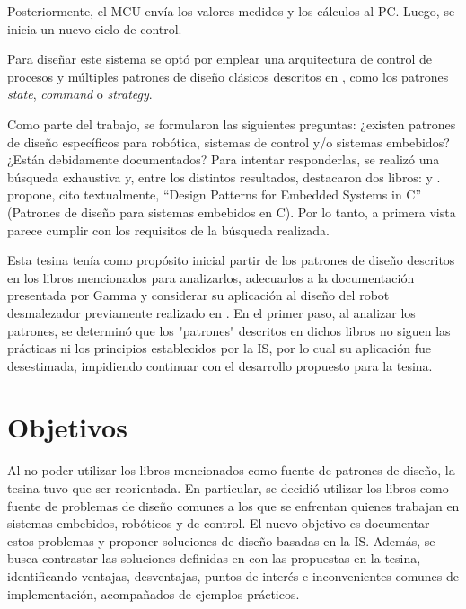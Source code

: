 Posteriormente, el MCU envía los valores medidos y los cálculos al PC. Luego, se inicia un nuevo ciclo de control.

Para diseñar este sistema se optó por emplear una arquitectura de control de procesos \cite[pág. 27]{ShawGarlan1996} y múltiples patrones de diseño clásicos descritos en \cite{Gamma:1995:DPE:186897}, como los patrones \textit{state}, \textit{command} o \textit{strategy}.

Como parte del trabajo, se formularon las siguientes preguntas: ¿existen patrones de diseño específicos para robótica, sistemas de control y/o sistemas embebidos? ¿Están debidamente documentados? Para intentar responderlas, se realizó una búsqueda exhaustiva y, entre los distintos resultados, destacaron dos libros: \cite{douglass} y \cite{elecia-embedded}. \cite{douglass} propone, cito textualmente, ``Design Patterns for Embedded Systems in C'' (Patrones de diseño para sistemas embebidos en C). Por lo tanto, a primera vista parece cumplir con los requisitos de la búsqueda realizada.

Esta tesina tenía como propósito inicial partir de los patrones de diseño descritos en los libros mencionados para analizarlos, adecuarlos a la documentación presentada por Gamma \cite{Gamma:1995:DPE:186897} y considerar su aplicación al diseño del robot desmalezador previamente realizado en \cite{paperPomponio}. En el primer paso, al analizar los patrones, se determinó que los "patrones" descritos en dichos libros no siguen las prácticas ni los principios establecidos por la IS, por lo cual su aplicación fue desestimada, impidiendo continuar con el desarrollo propuesto para la tesina.

\section*{Objetivos}

Al no poder utilizar los libros mencionados como fuente de patrones de diseño, la tesina tuvo que ser reorientada. En particular, se decidió utilizar los libros como fuente de problemas de diseño comunes a los que se enfrentan quienes trabajan en sistemas embebidos, robóticos y de control. El nuevo objetivo es documentar estos problemas y proponer soluciones de diseño basadas en la IS. Además, se busca contrastar las soluciones definidas en \cite{douglass} con las propuestas en la tesina, identificando ventajas, desventajas, puntos de interés e inconvenientes comunes de implementación, acompañados de ejemplos prácticos.

